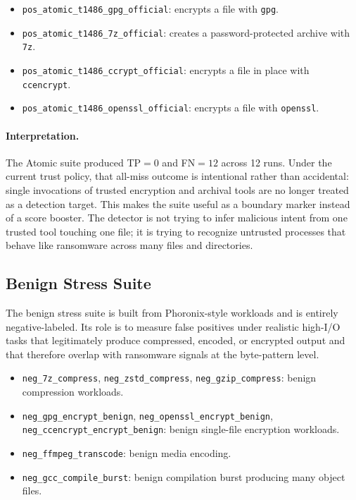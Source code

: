 \documentclass[twocolumn, 10pt]{scrartcl}
\begin{document}
\begin{itemize}
    \item \texttt{pos\_atomic\_t1486\_gpg\_official}: encrypts a file with \texttt{gpg}.
    \item \texttt{pos\_atomic\_t1486\_7z\_official}: creates a password-protected archive with \texttt{7z}.
    \item \texttt{pos\_atomic\_t1486\_ccrypt\_official}: encrypts a file in place with \texttt{ccencrypt}.
    \item \texttt{pos\_atomic\_t1486\_openssl\_official}: encrypts a file with \texttt{openssl}.
\end{itemize}

\paragraph{Interpretation.}
The Atomic suite produced TP$=0$ and FN$=12$ across 12 runs. Under the current trust policy, that all-miss outcome is intentional rather than accidental: single invocations of trusted encryption and archival tools are no longer treated as a detection target. This makes the suite useful as a boundary marker instead of a score booster. The detector is not trying to infer malicious intent from one trusted tool touching one file; it is trying to recognize untrusted processes that behave like ransomware across many files and directories.

\subsection{Benign Stress Suite}
The benign stress suite is built from Phoronix-style workloads and is entirely negative-labeled. Its role is to measure false positives under realistic high-I/O tasks that legitimately produce compressed, encoded, or encrypted output and that therefore overlap with ransomware signals at the byte-pattern level.

\begin{itemize}
    \item \texttt{neg\_7z\_compress}, \texttt{neg\_zstd\_compress}, \texttt{neg\_gzip\_compress}: benign compression workloads.
    \item \texttt{neg\_gpg\_encrypt\_benign}, \texttt{neg\_openssl\_encrypt\_benign}, \texttt{neg\_ccencrypt\_encrypt\_benign}: benign single-file encryption workloads.
    \item \texttt{neg\_ffmpeg\_transcode}: benign media encoding.
    \item \texttt{neg\_gcc\_compile\_burst}: benign compilation burst producing many object files.
\end{itemize}
\end{document}
